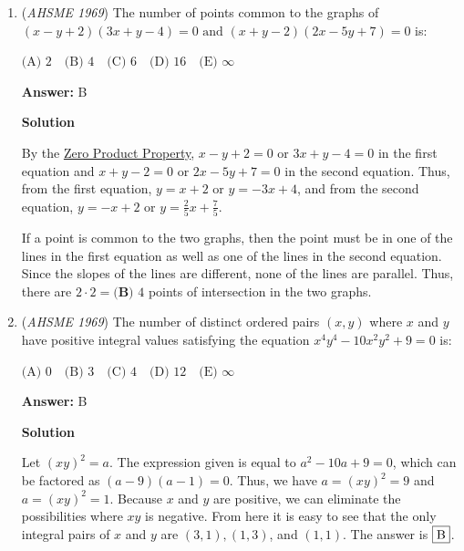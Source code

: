 \begin{enumerate}
 \textbf{Answer: }D



\textbf{Solution}

Let $2^x=a$. Because $2^{2x}=(2^x)^2$, the given expression can be rewritten as $a^2-8a+12=0$. This can be factored as $(a-6)(a-2)=0$, which has solutions $a=2^x=6$ and $a=2^x=2$. Looking at the answer choices, we see that $x=1$ is absent. Rewriting $2^x=6$ as $x=log_26$ and then applying the logarithm addition identity in reverse gives $x=log_2(2)+log_2(3)=1+log_2(3)$. Applying the logarithm division identity shows that the answer is $\fbox{D}$.

 


	\item (\textit{AHSME 1969}) The number of points common to the graphs of
$(x-y+2)(3x+y-4)=0 \text{    and     } (x+y-2)(2x-5y+7)=0$
is:


 $\text{(A) } 2\quad \text{(B) } 4\quad \text{(C) } 6\quad \text{(D) } 16\quad \text{(E) } \infty$

 \textbf{Answer: }B



\textbf{Solution}

By the \href{https://artofproblemsolving.com/wiki/index.php?title=Zero\_Product\_Property}{Zero Product Property}, $x-y+2=0$ or $3x+y-4=0$ in the first equation and $x+y-2=0$ or $2x-5y+7=0$ in the second equation.  Thus, from the first equation, $y = x+2$ or $y =-3x+4$, and from the second equation, $y=-x+2$ or $y = \frac{2}{5}x + \frac{7}{5}$.

 If a point is common to the two graphs, then the point must be in one of the lines in the first equation as well as one of the lines in the second equation.  Since the slopes of the lines are different, none of the lines are parallel.  Thus, there are $2 \cdot 2 = \boxed{\textbf{(B) } 4}$ points of intersection in the two graphs.

 


	\item (\textit{AHSME 1969}) The number of distinct ordered pairs $(x,y)$ where $x$ and $y$ have positive integral values satisfying the equation $x^4y^4-10x^2y^2+9=0$ is:


 $\text{(A) } 0\quad \text{(B) } 3\quad \text{(C) } 4\quad \text{(D) } 12\quad \text{(E) } \infty$

 \textbf{Answer: }B



\textbf{Solution}

Let $(xy)^2=a$. The expression given is equal to $a^2-10a+9=0$, which can be factored as $(a-9)(a-1)=0$. Thus, we have $a=(xy)^2=9$ and $a=(xy)^2=1$. Because $x$ and $y$ are positive, we can eliminate the possibilities where $xy$ is negative. From here it is easy to see that the only integral pairs of $x$ and $y$ are $(3, 1), (1, 3)$, and $(1, 1)$. The answer is $\fbox{B}$.


\end{enumerate}
